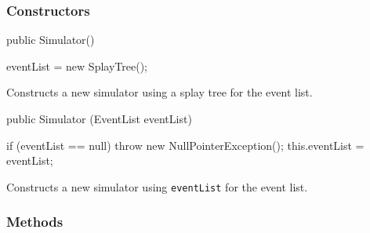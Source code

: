 \subsubsection*{Constructors}
\begin{code}
    
   public Simulator()\begin{hide} {
     eventList  = new SplayTree();
   }\end{hide}
\end{code}
\begin{tabb}  Constructs a new simulator using a splay tree for the
  event list.
\end{tabb}
\begin{code}

   public Simulator (EventList eventList)\begin{hide} {
     if (eventList == null)
        throw new NullPointerException();
     this.eventList = eventList;
   }\end{hide}
\end{code}
\begin{tabb}  Constructs a new simulator using \texttt{eventList} for
  the event list.
\end{tabb}
\subsubsection* {Methods}

